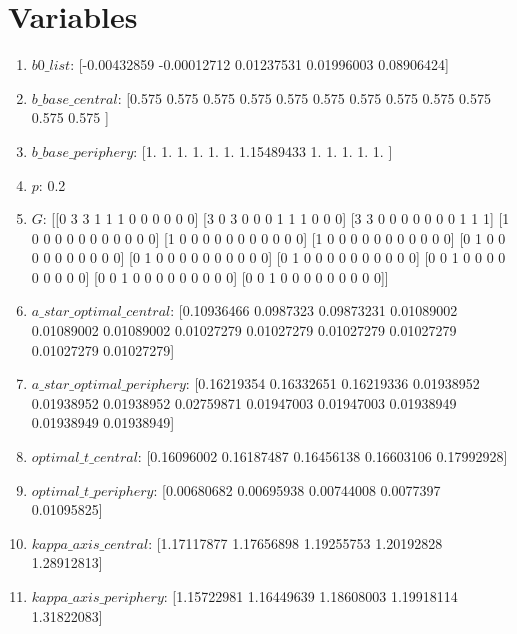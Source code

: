 \documentclass{article}
\begin{document}
\section{Variables}
\begin{enumerate}
\item $b0\_list$: [-0.00432859 -0.00012712  0.01237531  0.01996003  0.08906424]
\item $b\_base\_central$: [0.575    0.575      0.575      0.575      0.575      0.575
 0.575      0.575      0.575      0.575      0.575      0.575     ]
\item $b\_base\_periphery$: [1.         1.         1.         1.         1.         1.
 1.15489433 1.         1.         1.         1.         1.        ]
\item $p$: 0.2
\item $G$: [[0 3 3 1 1 1 0 0 0 0 0 0]
 [3 0 3 0 0 0 1 1 1 0 0 0]
 [3 3 0 0 0 0 0 0 0 1 1 1]
 [1 0 0 0 0 0 0 0 0 0 0 0]
 [1 0 0 0 0 0 0 0 0 0 0 0]
 [1 0 0 0 0 0 0 0 0 0 0 0]
 [0 1 0 0 0 0 0 0 0 0 0 0]
 [0 1 0 0 0 0 0 0 0 0 0 0]
 [0 1 0 0 0 0 0 0 0 0 0 0]
 [0 0 1 0 0 0 0 0 0 0 0 0]
 [0 0 1 0 0 0 0 0 0 0 0 0]
 [0 0 1 0 0 0 0 0 0 0 0 0]]
\item $a\_star\_optimal\_central$: [0.10936466 0.0987323  0.09873231 0.01089002 0.01089002 0.01089002
 0.01027279 0.01027279 0.01027279 0.01027279 0.01027279 0.01027279]
\item $a\_star\_optimal\_periphery$: [0.16219354 0.16332651 0.16219336 0.01938952 0.01938952 0.01938952
 0.02759871 0.01947003 0.01947003 0.01938949 0.01938949 0.01938949]
\item $optimal\_t\_central$: [0.16096002 0.16187487 0.16456138 0.16603106 0.17992928]
\item $optimal\_t\_periphery$: [0.00680682 0.00695938 0.00744008 0.0077397  0.01095825]
\item $kappa\_axis\_central$: [1.17117877 1.17656898 1.19255753 1.20192828 1.28912813]
\item $kappa\_axis\_periphery$: [1.15722981 1.16449639 1.18608003 1.19918114 1.31822083]
\end{enumerate}
\end{document}
